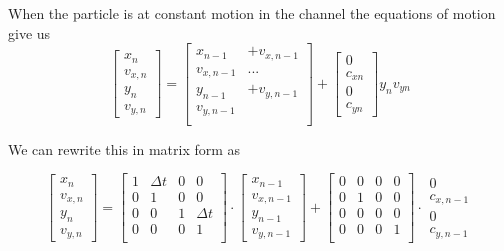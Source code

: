 	When the particle is at constant motion in the channel the equations of motion give us
	\begin{equation}
	\left[
	\begin{array}{c}
	  x_n	 \\
	 	  v_{x,n} \\ 
	  y_n	 \\
	  v_{y,n} 
	\end{array} 
	\right]
	 =
	 \begin{bmatrix}
	  x_{n-1} & + v_{x,n-1} \\
	  v_{x,n-1}       & ...		 \\
	  y_{n-1} &+v_{y,n-1}  \\
	  v_{y,n-1}       &		\\
	 \end{bmatrix}
	+
	\left[
	\begin{array}{c}
	0 \\
	c_{xn} \\
	0 \\
	c_{yn}
	\end{array}
	\right]
		y_n
		v_{yn}
	\end{equation}
	
	We can rewrite this in matrix form as
	
	\begin{equation}
	\left[
	 \begin{array}{c}
	 x_{n} \\
	 v_{x,n}\\
	 y_{n}\\
	 v_{y,n}
	 \end{array}
	 \right]
	 =
	 \begin{bmatrix}
	  1 & 	\Delta t & 	0 & 	0 \\
	  0 & 	1 & 	0 & 		0 \\
	  0 & 	0 & 	1 & \Delta t  \\
	  0 & 	0 & 	0 & 		1 \\
	 \end{bmatrix}
	 \cdot
	 \left[
	 \begin{array}{c}
	 x_{n-1} \\
	 v_{x,n-1}\\
	 y_{n-1}\\
	 v_{y,n-1}
	 \end{array}
	\right]
	 +
	 \begin{bmatrix}
	   0 & 	0 & 	0 & 	0 \\
	   0 & 	1 &		0 & 	0 \\
	   0 & 	0 & 	0 &    	0 \\
	   0 & 	0 & 	0 & 	1 \\
	  \end{bmatrix}
	  \cdot
	  \begin{array}{c}
	  0 \\
	  c_{x,n-1} \\
	  0 \\
	  c_{y,n-1}
	  \end{array}
	\end{equation}
	

